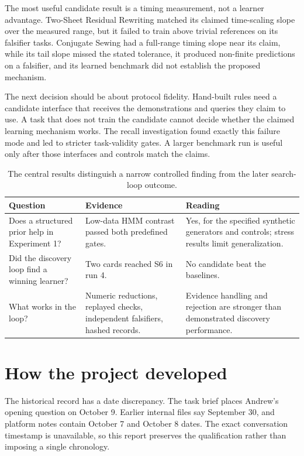 The most useful candidate result is a timing measurement, not a learner advantage. Two-Sheet Residual Rewriting matched its claimed time-scaling slope over the measured range, but it failed to train above trivial references on its falsifier tasks. Conjugate Sewing had a full-range timing slope near its claim, while its tail slope missed the stated tolerance, it produced non-finite predictions on a falsifier, and its learned benchmark did not establish the proposed mechanism.

The next decision should be about protocol fidelity. Hand-built rules need a candidate interface that receives the demonstrations and queries they claim to use. A task that does not train the candidate cannot decide whether the claimed learning mechanism works. The recall investigation found exactly this failure mode and led to stricter task-validity gates. A larger benchmark run is useful only after those interfaces and controls match the claims.

\begin{table}[ht]
\centering\small
\caption{The central results distinguish a narrow controlled finding from the later search-loop outcome.}
\begin{tabular}{p{3.1cm}p{5.1cm}p{5.4cm}}
\toprule
Question & Evidence & Reading \\
\midrule
Does a structured prior help in Experiment 1? & Low-data HMM contrast passed both predefined gates. & Yes, for the specified synthetic generators and controls; stress results limit generalization. \\
Did the discovery loop find a winning learner? & Two cards reached S6 in run 4. & No candidate beat the baselines. \\
What works in the loop? & Numeric reductions, replayed checks, independent falsifiers, hashed records. & Evidence handling and rejection are stronger than demonstrated discovery performance. \\
\bottomrule
\end{tabular}
\end{table}

\section{How the project developed}

The historical record has a date discrepancy. The task brief places Andrew's opening question on October 9. Earlier internal files say September 30, and platform notes contain October 7 and October 8 dates. The exact conversation timestamp is unavailable, so this report preserves the qualification rather than imposing a single chronology.

